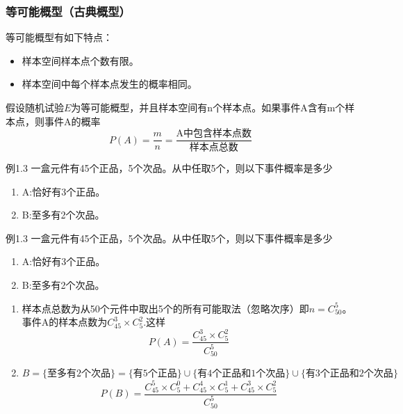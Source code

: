 \documentclass{beamer}
\begin{document}
	\begin{frame}
		\frametitle{等可能概型（古典概型）}
		等可能概型有如下特点：
		\begin{itemize}
			\item 样本空间样本点个数有限。
			\item 样本空间中每个样本点发生的概率相同。
		\end{itemize}
		假设随机试验$E$为等可能概型，并且样本空间有n个样本点。如果事件A含有m个样本点，则事件A的概率
		\[
		P(A) = \frac{m}{n} = \frac{\text{A中包含样本点数}}{\text{样本点总数}}
		\]
	\end{frame}
	
	\begin{frame}
		例1.3 一盒元件有45个正品，5个次品。从中任取5个，则以下事件概率是多少
		\begin{enumerate}
			\item A:恰好有3个正品。
			\item B:至多有2个次品。
		\end{enumerate}
	\end{frame}
	
	\begin{frame}
		例1.3 一盒元件有45个正品，5个次品。从中任取5个，则以下事件概率是多少
		\begin{enumerate}
			\item A:恰好有3个正品。
			\item B:至多有2个次品。
		\end{enumerate}
		\begin{enumerate}
			\item 样本点总数为从50个元件中取出5个的所有可能取法（忽略次序）即$n = C_{50}^{5}$。
			事件A的样本点数为$C_{45}^3 \times C_{5}^2$.这样
			\[
			P(A) = \frac{C_{45}^3 \times C_{5}^2}{C_{50}^{5}}
			\]
			\item $B = \{\text{至多有2个次品}\} = \{\text{有5个正品}\} \cup \{\text{有4个正品和1个次品}\} \cup \{\text{有3个正品和2个次品}\}$
			\[
			P(B) = \frac{C_{45}^5 \times C_{5}^{0} + C_{45}^4 \times C_{5}^{1} + C_{45}^{3} \times C_{5}^{2} }{C_{50}^5}
			\]
		\end{enumerate}
	\end{frame}
	
\end{document}
